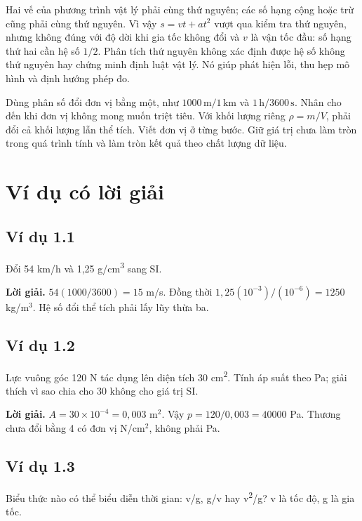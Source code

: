 \documentclass[11pt,a4paper,openany]{book}
\begin{document}
Hai vế của phương trình vật lý phải cùng thứ nguyên; các số hạng cộng hoặc trừ cũng phải cùng thứ nguyên. Vì vậy $s=vt+at^2$ vượt qua kiểm tra thứ nguyên, nhưng không đúng với độ dời khi gia tốc không đổi và $v$ là vận tốc đầu: số hạng thứ hai cần hệ số $1/2$. Phân tích thứ nguyên không xác định được hệ số không thứ nguyên hay chứng minh định luật vật lý. Nó giúp phát hiện lỗi, thu hẹp mô hình và định hướng phép đo.

Dùng phân số đổi đơn vị bằng một, như $1000\,\mathrm{m}/1\,\mathrm{km}$ và $1\,\mathrm{h}/3600\,\mathrm{s}$. Nhân cho đến khi đơn vị không mong muốn triệt tiêu. Với khối lượng riêng $\rho=m/V$, phải đổi cả khối lượng lẫn thể tích. Viết đơn vị ở từng bước. Giữ giá trị chưa làm tròn trong quá trình tính và làm tròn kết quả theo chất lượng dữ liệu.
\begin{center}
\end{center}
\section{Ví dụ có lời giải}
\subsection*{Ví dụ 1.1}
Đổi 54 km/h và 1,25 g/cm\textsuperscript{3} sang SI.

\textbf{Lời giải.} $54(1000/3600)=15$ m/s. Đồng thời $1{,}25(10^{-3})/(10^{-6})=1250$ kg/m$^3$. Hệ số đổi thể tích phải lấy lũy thừa ba.
\subsection*{Ví dụ 1.2}
Lực vuông góc 120 N tác dụng lên diện tích 30 cm\textsuperscript{2}. Tính áp suất theo Pa; giải thích vì sao chia cho 30 không cho giá trị SI.

\textbf{Lời giải.} $A=30\times10^{-4}=0{,}003$ m$^2$. Vậy $p=120/0{,}003=40000$ Pa. Thương chưa đổi bằng 4 có đơn vị N/cm$^2$, không phải Pa.
\subsection*{Ví dụ 1.3}
Biểu thức nào có thể biểu diễn thời gian: v/g, g/v hay v\textsuperscript{2}/g? v là tốc độ, g là gia tốc.
\end{document}
